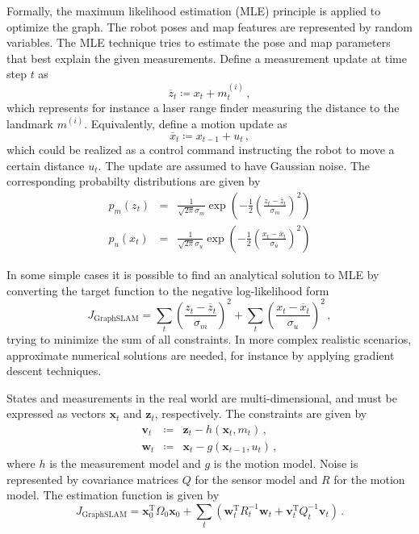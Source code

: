 \documentclass[10pt, journal, compsoc]{IEEEtran}
\newcommand{\gs}{GraphSLAM}
\begin{document}
Formally, the maximum likelihood estimation (MLE) principle is applied to optimize the graph. The robot poses and map features are represented by random variables. The MLE technique tries to estimate the pose and map parameters that best explain the given measurements. Define a measurement update at time step $t$ as
\begin{equation}
\label{eqn:measurement_update}
\overline{z}_t \coloneqq  x_t + m_t^{\left(i\right)} \, ,
\end{equation}
which represents for instance a laser range finder measuring the distance to the landmark $m^{\left(i\right)}$. Equivalently, define a motion update as
\begin{equation}
\label{eqn:motion_update}
\overline{x}_t \coloneqq  x_{t-1} + u_t \, ,
\end{equation}
which could be realized as a control command instructing the robot to move a certain distance $u_t$. The update are assumed to have Gaussian noise. The corresponding probabilty distributions are given by 
\begin{eqnarray}
\label{eqn:gaussian_measurement_update}
p_m \left( z_t \right)  & = & 
\frac{1}{\sqrt{2 \pi} \sigma_m}
\exp \left(-\frac{1}{2}\left(\frac{z_t -\overline{z}_t}{\sigma_m}\right)^2 \right)
\\
\label{eqn:gaussian_motion_update}
p_u \left( x_t \right)  & = &
\frac{1}{\sqrt{2 \pi} \sigma_u}
\exp \left(-\frac{1}{2}\left(\frac{x_t -\overline{x}_t}{\sigma_u}\right)^2 \right)
\end{eqnarray}

In some simple cases it is possible to find an analytical solution to MLE by converting the target function to the negative log-likelihood form
\begin{equation*}
J_{\mathrm{\gs}} = \sum_t
\left(\frac{z_t - \overline{z}_t}{\sigma_{m}} \right)^2
+ \sum_t
\left(\frac{x_t - \overline{x}_t}{\sigma_{u}} \right)^2
\, ,
\end{equation*}
trying to minimize the sum of all constraints. In more complex realistic scenarios, approximate numerical solutions are needed, for instance by applying gradient descent techniques.

States and measurements in the real world are multi-dimensional, and must be expressed as vectors $\mathbf{x}_t$ and $\mathbf{z}_t$, respectively. The constraints are given by
\begin{eqnarray}
\mathbf{v}_t & \coloneqq &
\mathbf{z}_t - h \left(\mathbf{x}_t , m_t \right) \, ,  
\\
\mathbf{w}_t & \coloneqq &
\mathbf{x}_t - g \left(\mathbf{x}_{t-1} , u_t \right) \, ,
\end{eqnarray}
where $h$ is the measurement model and $g$ is the motion model. Noise is represented by covariance matrices $Q$ for the sensor model and $R$ for the motion model. The estimation function is given by
\begin{equation*}
J_{\mathrm{\gs}} =
\mathbf{x}_{0}^{\mathrm{T}} \Omega_{0} \mathbf{x}_{0}
+ \sum_t \left(
\mathbf{w}_{t}^{\mathrm{T}} R_{t}^{-1} \mathbf{w}_{t} +
\mathbf{v}_{t}^{\mathrm{T}} Q_{t}^{-1} \mathbf{v}_{t}
\right) \, .
\end{equation*}
\end{document}

